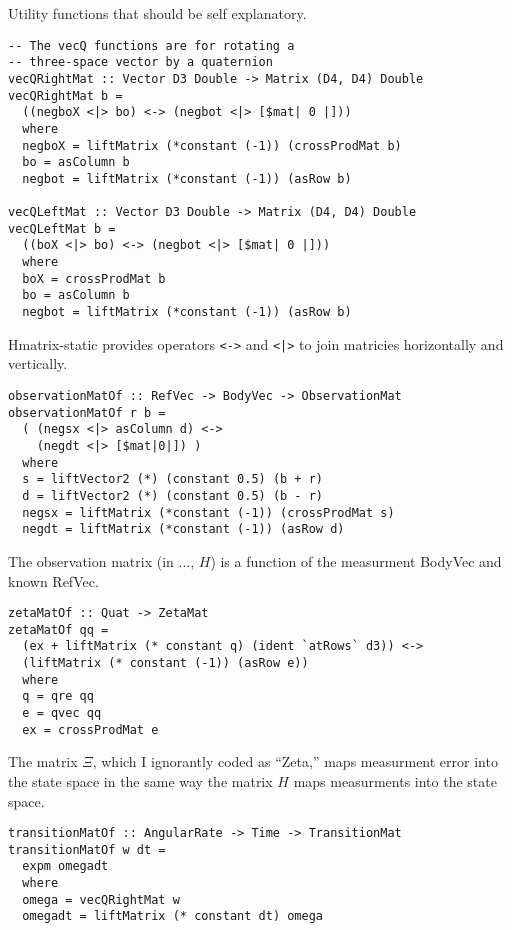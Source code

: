 \documentclass[12pt]{report}
\begin{document}
Utility functions that should be self explanatory.

\begin{lstlisting}
-- The vecQ functions are for rotating a 
-- three-space vector by a quaternion
vecQRightMat :: Vector D3 Double -> Matrix (D4, D4) Double
vecQRightMat b = 
  ((negboX <|> bo) <-> (negbot <|> [$mat| 0 |]))
  where 
  negboX = liftMatrix (*constant (-1)) (crossProdMat b)
  bo = asColumn b
  negbot = liftMatrix (*constant (-1)) (asRow b)

vecQLeftMat :: Vector D3 Double -> Matrix (D4, D4) Double
vecQLeftMat b = 
  ((boX <|> bo) <-> (negbot <|> [$mat| 0 |]))
  where 
  boX = crossProdMat b
  bo = asColumn b
  negbot = liftMatrix (*constant (-1)) (asRow b)
\end{lstlisting}

Hmatrix-static provides operators \lstinline$<->$ and \lstinline$<|>$ to join matricies horizontally and vertically.

\begin{lstlisting}
observationMatOf :: RefVec -> BodyVec -> ObservationMat
observationMatOf r b = 
  ( (negsx <|> asColumn d) <->
    (negdt <|> [$mat|0|]) )
  where 
  s = liftVector2 (*) (constant 0.5) (b + r)
  d = liftVector2 (*) (constant 0.5) (b - r)
  negsx = liftMatrix (*constant (-1)) (crossProdMat s)
  negdt = liftMatrix (*constant (-1)) (asRow d)
\end{lstlisting}

The observation matrix (in ..., $H$) is a function of the measurment BodyVec and known RefVec.

\begin{lstlisting}
zetaMatOf :: Quat -> ZetaMat
zetaMatOf qq = 
  (ex + liftMatrix (* constant q) (ident `atRows` d3)) <-> 
  (liftMatrix (* constant (-1)) (asRow e))
  where 
  q = qre qq
  e = qvec qq
  ex = crossProdMat e

\end{lstlisting}

The matrix $\Xi$, which I ignorantly coded as ``Zeta,'' maps measurment error into the state space in the same way the matrix $H$ maps measurments into the state space.

\begin{lstlisting}
transitionMatOf :: AngularRate -> Time -> TransitionMat
transitionMatOf w dt = 
  expm omegadt
  where 
  omega = vecQRightMat w
  omegadt = liftMatrix (* constant dt) omega

\end{lstlisting}
\end{document}
